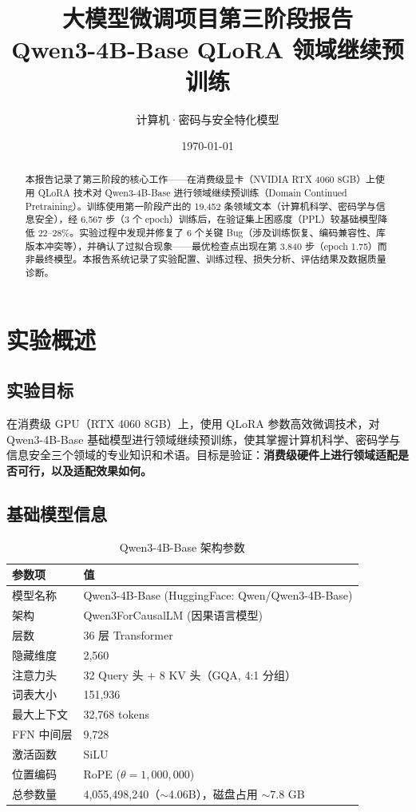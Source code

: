 \documentclass[12pt,a4paper]{ctexart}
\title{\textbf{大模型微调项目第三阶段报告}\\[4pt]\large Qwen3-4B-Base QLoRA 领域继续预训练}
\author{计算机·密码与安全特化模型}
\date{\today}
\begin{document}
\maketitle\thispagestyle{empty}

\begin{abstract}
\noindent 本报告记录了第三阶段的核心工作——在消费级显卡（NVIDIA RTX 4060 8GB）上使用 QLoRA 技术对 Qwen3-4B-Base 进行领域继续预训练（Domain Continued Pretraining）。训练使用第一阶段产出的 19,452 条领域文本（计算机科学、密码学与信息安全），经 6,567 步（3 个 epoch）训练后，在验证集上困惑度（PPL）较基础模型降低 22--28\%。实验过程中发现并修复了 6 个关键 Bug（涉及训练恢复、编码兼容性、库版本冲突等），并确认了过拟合现象——最优检查点出现在第 3,840 步（epoch 1.75）而非最终模型。本报告系统记录了实验配置、训练过程、损失分析、评估结果及数据质量诊断。
\end{abstract}

\section{实验概述}

\subsection{实验目标}

在消费级 GPU（RTX 4060 8GB）上，使用 QLoRA 参数高效微调技术，对 Qwen3-4B-Base 基础模型进行领域继续预训练，使其掌握计算机科学、密码学与信息安全三个领域的专业知识和术语。目标是验证：\textbf{消费级硬件上进行领域适配是否可行，以及适配效果如何。}

\subsection{基础模型信息}

\begin{table}[htbp]\centering
\caption{Qwen3-4B-Base 架构参数}
\begin{tabular}{@{}ll@{}}
\toprule
\textbf{参数项} & \textbf{值} \\
\midrule
模型名称   & Qwen3-4B-Base (HuggingFace: Qwen/Qwen3-4B-Base) \\
架构       & Qwen3ForCausalLM (因果语言模型) \\
层数       & 36 层 Transformer \\
隐藏维度   & 2,560 \\
注意力头   & 32 Query 头 + 8 KV 头（GQA, 4:1 分组） \\
词表大小   & 151,936 \\
最大上下文 & 32,768 tokens \\
FFN 中间层 & 9,728 \\
激活函数   & SiLU \\
位置编码   & RoPE ($\theta = 1{,}000{,}000$) \\
总参数量   & 4,055,498,240（$\sim$4.06B），磁盘占用 $\sim$7.8 GB \\
\bottomrule
\end{tabular}
\end{table}
\end{document}
